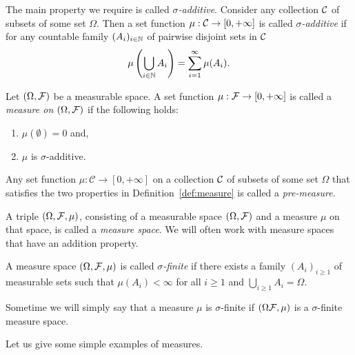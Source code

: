The main property we require is called \emph{$\sigma$-additive}. Consider any collection $\mathcal C$ of subsets of some set $\Omega$. Then a set function $\mu : \mathcal C \to [0,+\infty]$ is called \emph{$\sigma$-additive} if for any countable family $(A_i)_{i \in \mathbb N}$ of pairwise disjoint sets in $\mathcal C$
\[
	\mu\left(\bigcup_{i \in \mathbb N} A_i\right) = \sum_{i = 1}^\infty \mu(A_i).
\]

\begin{definition}[Measure]\label{def:measure}
Let $(\Omega, \mathcal F)$ be a measurable space. A set function $\mu : \mathcal F \to [0,+\infty]$ is called a \emph{measure on $(\Omega, \mathcal F)$} if the following holds:
\begin{enumerate}[label={(\arabic*)}]
\item $\mu(\emptyset) = 0$ and,
\item $\mu$ is $\sigma$-additive.
\end{enumerate}
\end{definition}

Any set function $\mu : \mathcal{C} \to [0,+\infty]$ on a collection $\mathcal C$ of subsets of some set $\Omega$ that satisfies the two properties in Definition~\ref{def:measure} is called a \emph{pre-measure}.

A triple $(\Omega, \mathcal F, \mu)$, consisting of a measurable space $(\Omega, \mathcal F)$ and a measure $\mu$ on that space, is called a \emph{measure space}. We will often work with measure spaces that have an addition property.

\begin{definition}\label{def:sigma-finite}
A measure space $(\Omega, \mathcal F, \mu)$ is called \emph{$\sigma$-finite} if there exists a family $(A_i)_{i \ge 1}$ of measurable sets such that $\mu(A_i) < \infty$ for all $i \ge 1$ and $\bigcup_{i \ge 1} A_i = \Omega$.
\end{definition}

Sometime we will simply say that a measure $\mu$ is $\sigma$-finite if $(\Omega \mathcal F, \mu)$ is a $\sigma$-finite measure space.

Let us give some simple examples of measures.


